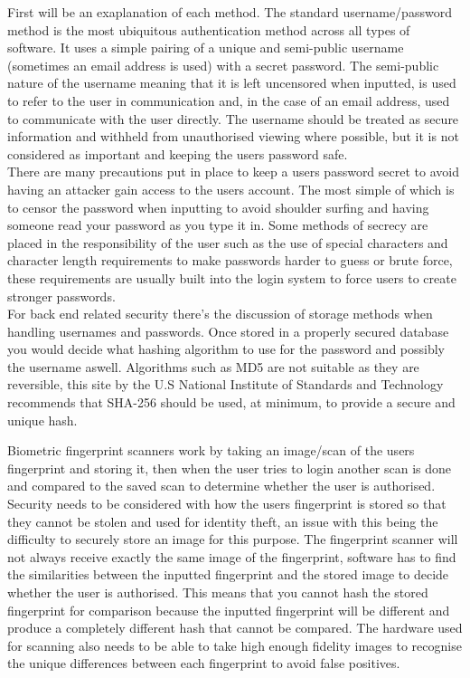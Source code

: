 \documentclass{ueacmpstyle}
\begin{document}
    First will be an exaplanation of each method. The standard username/password method is 
    the most ubiquitous authentication method across all types of software. It uses a simple 
    pairing of a unique and semi-public username (sometimes an email address is used) with a 
    secret password. The semi-public nature of the username meaning that it is left 
    uncensored when inputted, is used to refer to the user in communication and, in 
    the case of an email address, used to communicate with the user directly. The username 
    should be treated as secure information and withheld from unauthorised viewing where 
    possible, but it is not considered as important and keeping the users password safe. 
    \\
    There are many precautions put in place to keep a users password secret to avoid having 
    an attacker gain access to the users account. The most simple of which is to censor the 
    password when inputting to avoid shoulder surfing and having someone read your password 
    as you type it in. Some methods of secrecy are placed in the responsibility of the user 
    such as the use of special characters and character length requirements to make passwords 
    harder to guess or brute force, these requirements are usually built into the login 
    system to force users to create stronger passwords. 
    \\
    For back end related security there's the discussion of storage methods when handling 
    usernames and passwords. Once stored in a properly secured database you would decide 
    what hashing algorithm to use for the password and possibly the username aswell. 
    Algorithms such as MD5 are not suitable as they are reversible, this site \citep{NISTHashFunctions} 
    by the U.S National Institute of Standards and Technology recommends that SHA-256 
    should be used, at minimum, to provide a secure and unique hash. 

    Biometric fingerprint scanners work by taking an image/scan of the users fingerprint 
    and storing it, then when the user tries to login another scan is done and compared to 
    the saved scan to determine whether the user is authorised. Security needs to be 
    considered with how the users fingerprint is stored so that they cannot be stolen and 
    used for identity theft, an issue with this being the difficulty to securely store an 
    image for this purpose. The fingerprint scanner will not always receive exactly the 
    same image of the fingerprint, software has to find the similarities between the 
    inputted fingerprint and the stored image to decide whether the user is authorised. 
    This means that you cannot hash the stored fingerprint for comparison because the 
    inputted fingerprint will be different and produce a completely different hash that 
    cannot be compared. The hardware used for scanning also needs to be able to take 
    high enough fidelity images to recognise the unique differences between each fingerprint 
    to avoid false positives.
\end{document}
